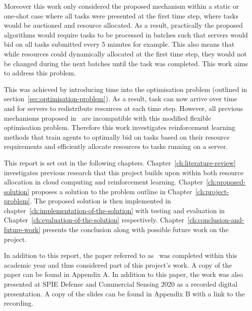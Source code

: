 Moreover this work only considered the proposed mechanism within a static or one-shot case where all tasks were presented
at the first time step, where tasks would be auctioned and resource allocated. As a result, practically the proposed
algorithms would require tasks to be processed in batches such that servers would bid on all tasks submitted every 5
minutes for example. This also means that while resources could dynamically allocated at the first time step, they
would not be changed during the next batches until the task was completed. This work aims to address this problem.

This was achieved by introducing time into the optimisation problem (outlined in section~\ref{sec:optimisation-problem}).
As a result, task can now arrive over time and for servers to redistribute resources at each time step. However, all
previous mechanisms proposed in~\cite{FlexibleResourceAllocation} are incompatible with this modified flexible
optimisation problem. Therefore this work investigates reinforcement learning methods that train agents to optimally
bid on tasks based on their resource requirements and efficiently allocate resources to tasks running on a server.

This report is set out in the following chapters. Chapter~\ref{ch:literature-review} investigates previous research
that this project builds upon within both resource allocation in cloud computing and reinforcement learning.
Chapter~\ref{ch:proposed-solution} proposes a solution to the problem outline in Chapter~\ref{ch:project-problem}.
The proposed solution is then implemented in chapter~\ref{ch:implementation-of-the-solution} with testing and
evaluation in Chapter~\ref{ch:evaluation-of-the-solution} respectively.
Chapter~\ref{ch:conclusion-and-future-work} presents the conclusion along with possible future work on the project.

In addition to this report, the paper referred to as~\cite{FlexibleResourceAllocation} was completed within this
academic year and thus considered part of this project's work. A copy of the paper can be found in
Appendix A. In addition to this paper, the work was also presented at SPIE Defense and Commercial
Sensing 2020 as a recorded digital presentation. A copy of the slides can be found in
Appendix B with a link to the recording.

